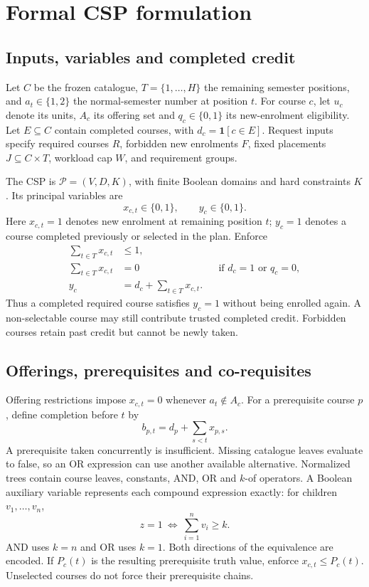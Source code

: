 \documentclass[11pt,a4paper]{article}
\begin{document}
\par
\section{Formal CSP formulation}
\subsection{Inputs, variables and completed credit}
Let $C$ be the frozen catalogue, $T=\{1,\ldots,H\}$ the remaining semester
positions, and $a_t\in\{1,2\}$ the normal-semester number at position $t$.
For course $c$, let $u_c$ denote its units, $A_c$ its offering set and
$q_c\in\{0,1\}$ its new-enrolment eligibility. Let $E\subseteq C$ contain
completed courses, with $d_c=\mathbf{1}[c\in E]$. Request inputs specify
required courses $R$, forbidden new enrolments $F$, fixed placements
$J\subseteq C\times T$, workload cap $W$, and requirement groups.

The CSP is $\mathcal{P}=(V,D,K)$, with finite Boolean domains and hard
constraints $K$. Its principal variables are
\[
 x_{c,t}\in\{0,1\},\qquad y_c\in\{0,1\}.
\]
Here $x_{c,t}=1$ denotes new enrolment at remaining position $t$; $y_c=1$
denotes a course completed previously or selected in the plan. Enforce
\begin{align}
 \sum_{t\in T}x_{c,t}&\leq 1, \label{eq:once}\\
 \sum_{t\in T}x_{c,t}&=0
       &&\text{if }d_c=1\text{ or }q_c=0, \label{eq:elig}\\
 y_c&=d_c+\sum_{t\in T}x_{c,t}. \label{eq:link}
\end{align}
Thus a completed required course satisfies $y_c=1$ without being enrolled
again. A non-selectable course may still contribute trusted completed credit.
Forbidden courses retain past credit but cannot be newly taken.

\subsection{Offerings, prerequisites and co-requisites}
Offering restrictions impose $x_{c,t}=0$ whenever $a_t\notin A_c$.
For a prerequisite course $p$, define completion before $t$ by
\[
 b_{p,t}=d_p+\sum_{s<t}x_{p,s}.
\]
A prerequisite taken concurrently is insufficient. Missing catalogue leaves
evaluate to false, so an OR expression can use another available alternative.
Normalized trees contain course leaves, constants, AND, OR and $k$-of
operators. A Boolean auxiliary variable represents each compound expression
exactly: for children $v_1,\ldots,v_n$,
\[
 z=1\ \Longleftrightarrow\ \sum_{i=1}^n v_i\geq k .
\]
AND uses $k=n$ and OR uses $k=1$. Both directions of the equivalence are
encoded. If $P_c(t)$ is the resulting prerequisite truth value, enforce
$x_{c,t}\leq P_c(t)$. Unselected courses do not force their prerequisite chains.
\end{document}
